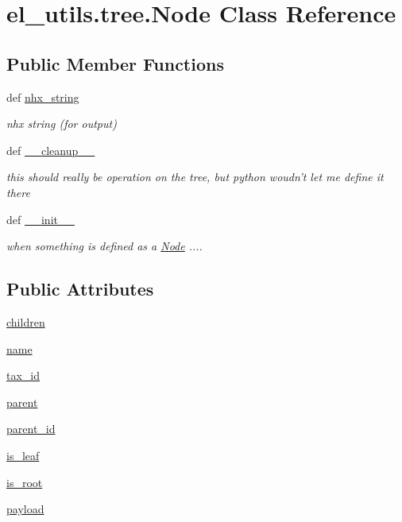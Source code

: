 \hypertarget{classel__utils_1_1tree_1_1Node}{\section{el\-\_\-utils.\-tree.\-Node Class Reference}
\label{classel__utils_1_1tree_1_1Node}
}
\subsection*{Public Member Functions}
\begin{DoxyCompactItemize}
\item 
def \hyperlink{classel__utils_1_1tree_1_1Node_a524f42699c08486bfc943ca7fb26b7ec}{nhx\-\_\-string}
\begin{DoxyCompactList}\small\item\em nhx string (for output) \end{DoxyCompactList}\item 
def \hyperlink{classel__utils_1_1tree_1_1Node_a595b3e3d5367f64fb3dcbe81b76921c7}{\-\_\-\-\_\-cleanup\-\_\-\-\_\-}
\begin{DoxyCompactList}\small\item\em this should really be operation on the tree, but python woudn't let me define it there \end{DoxyCompactList}\item 
def \hyperlink{classel__utils_1_1tree_1_1Node_adbf4409659c6b8e8a47394de01797846}{\-\_\-\-\_\-init\-\_\-\-\_\-}
\begin{DoxyCompactList}\small\item\em when something is defined as a \hyperlink{classel__utils_1_1tree_1_1Node}{Node} .... \end{DoxyCompactList}\end{DoxyCompactItemize}
\subsection*{Public Attributes}
\begin{DoxyCompactItemize}
\item 
\hyperlink{classel__utils_1_1tree_1_1Node_a83233d1f42bfae8c136348b118b2c81f}{children}
\item 
\hyperlink{classel__utils_1_1tree_1_1Node_aaeebcc1ad107943948b7723a99e93dce}{name}
\item 
\hyperlink{classel__utils_1_1tree_1_1Node_a717fe6ca6e3f95275a6f87b425979820}{tax\-\_\-id}
\item 
\hyperlink{classel__utils_1_1tree_1_1Node_adede05fe82711303e58de200481a28b9}{parent}
\item 
\hyperlink{classel__utils_1_1tree_1_1Node_ad0c7ca307755af19cd2e0449fc88262e}{parent\-\_\-id}
\item 
\hyperlink{classel__utils_1_1tree_1_1Node_a3e365d9b3ed70b11cd0f60350afe4bcc}{is\-\_\-leaf}
\item 
\hyperlink{classel__utils_1_1tree_1_1Node_a3978bd558935a85d0bd54ffa62b627cf}{is\-\_\-root}
\item 
\hyperlink{classel__utils_1_1tree_1_1Node_a482f6b391b479d7a8cd2b858ddcf15d4}{payload}
\end{DoxyCompactItemize}


